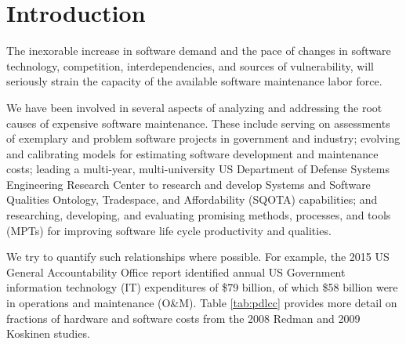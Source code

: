 \section{Introduction}
\label{sec:introudction}

The inexorable increase in software demand and the pace of changes in software technology, competition, interdependencies, and sources of vulnerability, will seriously strain the capacity of the available software maintenance labor force.

We have been involved in several aspects of analyzing and addressing the root causes of expensive software maintenance.
These include serving on assessments of
exemplary and
problem software projects in government and industry;
evolving and calibrating models for estimating software development and maintenance costs;
leading a multi-year, multi-university US Department of Defense Systems Engineering Research Center to research and develop Systems and Software Qualities Ontology, Tradespace, and Affordability (SQOTA) capabilities;
and researching, developing, and evaluating promising methods, processes, and tools (MPTs) for improving software life cycle productivity and qualities.

We try to quantify such relationships where possible.
For example, the 2015 US General Accountability Office report \cite{dodaro2015government} identified annual US Government information technology (IT) expenditures of \$79 billion, of which \$58 billion were in operations and maintenance (O\&M).
Table \ref{tab:pdlcc} provides more detail on fractions of hardware and software costs from the 2008 Redman \cite{redman2008weapon} and  2009 Koskinen \cite{koskinen2009software} studies.


\begin{table}[htbp]
	\centering
	\caption{Percentage of Post-Deployment Life Cycle Cost}
	\label{tab:pdlcc}
	\vspace{-0.3cm}
\end{table}%

